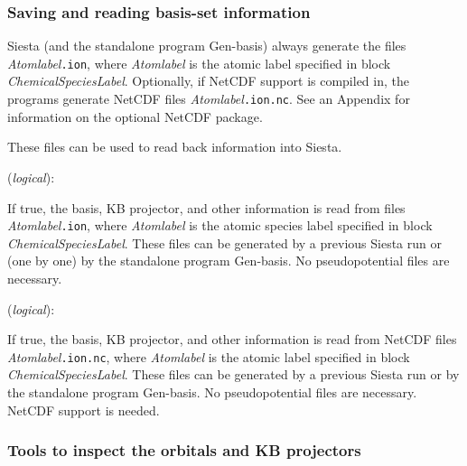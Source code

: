 \documentclass[11pt]{article}
\begin{document}
\subsubsection{Saving and reading basis-set information}

{\sc Siesta} (and the standalone program {\sc Gen-basis})
always generate the files
{\it Atomlabel}{\tt .ion}, where {\it Atomlabel} is the atomic label
specified in block {\it ChemicalSpeciesLabel}.  Optionally, if
NetCDF support is compiled in, the programs generate
NetCDF files 
{\it Atomlabel}{\tt .ion.nc}.
See an Appendix for information on the optional NetCDF package.

These files can be used to read back information into {\sc Siesta}.

\begin{description}
\itemsep 10pt
\parsep 0pt
\item[{\bf User.Basis}] ({\it logical}):

If true, the basis, KB projector, and other information is read from
files {\it Atomlabel}{\tt .ion}, where {\it Atomlabel} is the atomic
species label specified in block {\it ChemicalSpeciesLabel}. These
files can be generated by a previous {\sc Siesta} run or (one by one) by the
standalone program {\sc Gen-basis}. No pseudopotential
files are necessary.

\item[{\bf User.Basis.NetCDF}] ({\it logical}):

If true, the basis, KB projector, and other information is read from
NetCDF files {\it Atomlabel}{\tt .ion.nc}, where {\it Atomlabel} is
the atomic label specified in block {\it ChemicalSpeciesLabel}. These
files can be generated by a previous {\sc Siesta} run or by the
standalone program {\sc Gen-basis}. No pseudopotential
files are necessary. NetCDF support is needed.

\end{description}

\subsubsection{Tools to inspect the orbitals and KB projectors}
\end{document}

